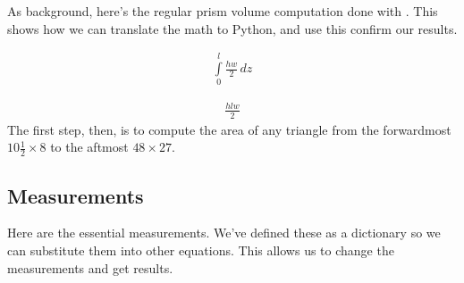 \documentclass[letterpaper,10pt,english]{sphinxmanual}
\begin{document}
\sphinxAtStartPar
As background, here’s the regular prism volume computation done with . This shows how we can translate the math to Python, and use this confirm our results.

\begin{sphinxVerbatim}[commandchars=\\\{\}]
     

   
\end{sphinxVerbatim}
\begin{equation*}
\begin{split}\displaystyle \int\limits_{0}^{l} \frac{h w}{2}\, dz\end{split}
\end{equation*}
\begin{sphinxVerbatim}[commandchars=\\\{\}]
   
\end{sphinxVerbatim}
\begin{equation*}
\begin{split}\displaystyle \frac{h l w}{2}\end{split}
\end{equation*}
\sphinxAtStartPar
The first step, then, is to compute the area of any triangle from the forward\sphinxhyphen{}most \(10 \tfrac{1}{2} \times 8\) to the aft\sphinxhyphen{}most \(48 \times 27\).


\subsection{Measurements}
\label{\detokenize{prism-irregular:measurements}}
\sphinxAtStartPar
Here are the essential measurements. We’ve defined these as a dictionary so we can substitute them into other equations. This allows us to change the measurements and get results.
\end{document}
